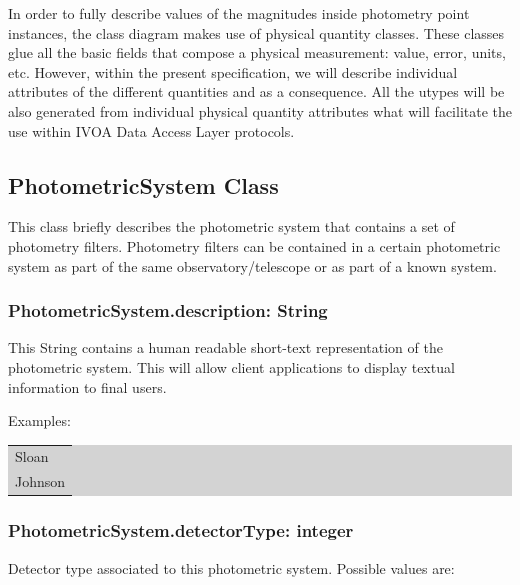 \documentclass[11pt,a4paper]{ivoa}
\begin{document}

\newpage


\newpage
In order to fully describe values of the magnitudes inside photometry point instances, the class diagram makes use of physical quantity classes. These classes glue all the basic fields that compose a physical measurement: value, error, units, etc. However, within the present specification, we will describe individual attributes of the different quantities and as a consequence. All the utypes will be also generated from individual physical quantity attributes what will facilitate the use within IVOA Data Access Layer protocols.
\par

\subsection{PhotometricSystem Class}
This class briefly describes the photometric system that contains a set of photometry filters. Photometry filters can be contained in a certain photometric system as part of the same observatory/telescope or as part of a known system.
\par

\subsubsection{PhotometricSystem.description: String}
This String contains a human readable short-text representation of the photometric system. This will allow client applications to display textual information to final users.
\par

Examples:
\par


\bigskip
\begingroup\setlength{\fboxsep}{0pt}
\colorbox{lightgray}{%
\begin{tabular}{|p{5.53in}|}

Sloan \\
Johnson
\end{tabular}%
}\endgroup
\par
\bigskip



\subsubsection{PhotometricSystem.detectorType: integer}
Detector type associated to this photometric system. Possible values are:
\end{document}
